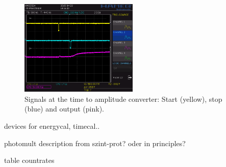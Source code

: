 \begin{figure}[H]
\begin{center}
  \includegraphics[width=0.5\textwidth]{../img/S0008.PNG}
  \caption{Signals at the time to amplitude converter: Start (yellow), stop (blue) and output (pink).}
  \label{img:tac}
\end{center}
\end{figure}


devices for energycal, timecal..


 	
 	
 	photomult description from szint-prot? oder in principles?
 	
 	table countrates